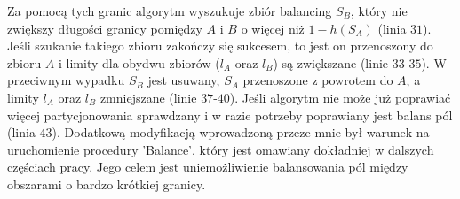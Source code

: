 Za pomocą tych granic algorytm wyszukuje zbiór balancing $S_B$, który nie zwiększy długości granicy pomiędzy $A$ i $B$
o więcej niż $1 - h(S_A)$ (linia $31$).
Jeśli szukanie takiego zbioru zakończy się sukcesem, to jest on przenoszony do zbioru $A$ i limity dla obydwu zbiorów
($l_A$ oraz $l_B$) są zwiększane (linie $33$-$35$).
W przeciwnym wypadku $S_B$ jest usuwany, $S_A$ przenoszone z powrotem do $A$, a limity $l_A$ oraz $l_B$ zmniejszane
(linie $37$-$40$).
Jeśli algorytm nie może już poprawiać więcej partycjonowania sprawdzany i w razie potrzeby poprawiany jest balans pól
(linia $43$).
Dodatkową modyfikacją wprowadzoną przeze mnie był warunek na uruchomienie procedury 'Balance', który jest omawiany
dokładniej w dalszych częściach pracy.
Jego celem jest uniemożliwienie balansowania pól między obszarami o bardzo krótkiej granicy.
